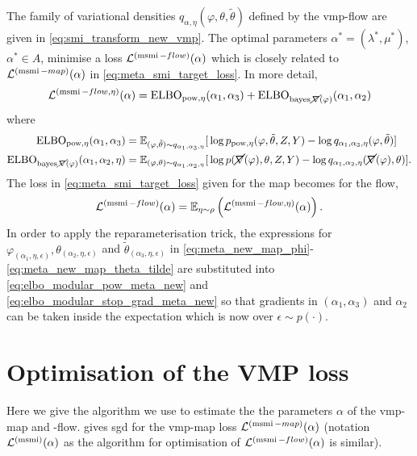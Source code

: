The family of variational densities $q_{\alpha,\eta}(\varphi,\theta,\tilde\theta)$ defined by the \acrshort*{vmp}-flow are given in \cref{eq:smi_transform_new_vmp}. The optimal parameters $\alpha^*=(\lambda^*,\mu^*)$, $\alpha^*\in A$, minimise a loss $\mathcal{L}^{(\operatorname{\text{msmi}}-flow)}(\alpha)$ which is closely related to $\mathcal{L}^{(\operatorname{\text{msmi}}-map)}(\alpha)$ in \cref{eq:meta_smi_target_loss}. In more detail,
\begin{align} \label{eq:vsmi_loss-meta-new}
  \mathcal{L}^{( \operatorname{\text{msmi}}-flow, \eta)}(\alpha) = \operatorname{\text{ELBO}}_{\operatorname{\text{pow}}, \eta}(\alpha_1,\alpha_3) + \operatorname{\text{ELBO}}_{\operatorname{\text{bayes}} \cancel{\nabla}(\varphi)}(\alpha_1,\alpha_2)
\end{align}
where
\begin{align}
  \operatorname{\text{ELBO}}_{\operatorname{\text{pow}}, \eta}(\alpha_1,\alpha_3) = \operatorname{\mathbb{E}}_{(\varphi,\tilde\theta)\sim q_{\alpha_1,\alpha_3,\eta}}[                & \log p_{\operatorname{\text{pow}}, \eta}(\varphi, \tilde\theta, Z, Y) - \log q_{\alpha_1,\alpha_3,\eta}(\varphi, \tilde\theta) ] \label{eq:elbo_modular_pow_meta_new}                  \\
  \operatorname{\text{ELBO}}_{\operatorname{\text{bayes}} \cancel{\nabla}(\varphi)}(\alpha_1,\alpha_2,\eta) = \operatorname{\mathbb{E}}_{(\varphi,\theta)\sim q_{\alpha_1,\alpha_2,\eta}}[ & \log p( \cancel{\nabla}(\varphi), \theta, Z, Y) - \log q_{\alpha_1,\alpha_2,\eta}(\cancel{\nabla}(\varphi), \theta) ]. \label{eq:elbo_modular_stop_grad_meta_new}
\end{align}
The loss in \cref{eq:meta_smi_target_loss} given for the map becomes for the flow,
\[
 \mathcal{L}^{(\operatorname{\text{msmi}}-flow)}(\alpha) =\operatorname{\mathbb{E}}_{\eta\sim\rho}\left(\mathcal{L}^{(\operatorname{\text{msmi}}-flow,\eta)}(\alpha)\right).
\]
In order to apply the reparameterisation trick, the expressions for $\varphi_{(\alpha_1,\eta,\epsilon)}, \theta_{(\alpha_2,\eta,\epsilon)}$ and $\tilde\theta_{(\alpha_3,\eta,\epsilon)}$ in \cref{eq:meta_new_map_phi}-\cref{eq:meta_new_map_theta_tilde} are substituted into \cref{eq:elbo_modular_pow_meta_new} and \cref{eq:elbo_modular_stop_grad_meta_new} so that gradients in $(\alpha_1,\alpha_3)$ and $\alpha_2$ can be taken inside the expectation which is now over $\epsilon\sim p(\cdot)$.

\newpage
\section{Optimisation of the VMP loss}\label{sec:sgd-for-meta-losses}

Here we give the algorithm we use to estimate the the parameters $\alpha$ of the \acrshort*{vmp}-map and -flow.  gives \acrshort*{sgd} for the \acrshort*{vmp}-map loss $\mathcal{L}^{(\operatorname{\text{msmi}}-map)}(\alpha)$ (notation $\mathcal{L}^{(\operatorname{\text{msmi}})}(\alpha)$ as the algorithm for optimisation of $\mathcal{L}^{(\operatorname{\text{msmi}}-flow)}(\alpha)$ is similar).

